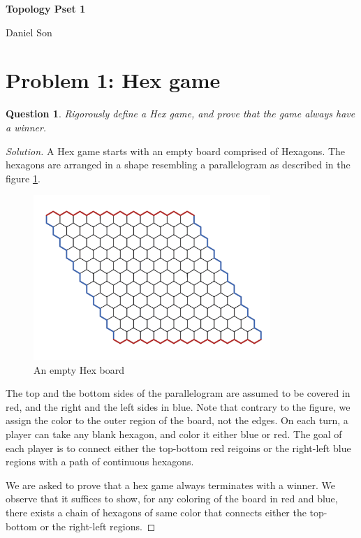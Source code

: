 \documentclass{article}
\newtheorem{question}{Question}
\begin{document}
\begin{center}
    \Large
    \textbf{Topology Pset 1}

    \large
    Daniel Son
\end{center}

\section{Problem 1: Hex game}
\begin{question}
Rigorously define a Hex game, and prove that the game always have a winner. 
\end{question}

\begin{proof}[Solution]
    A Hex game starts with an empty board comprised of Hexagons. The hexagons are arranged in a shape resembling a parallelogram as described in the figure \ref{fig:HexBoard}. 
    \begin{figure}[h]
        \centering
        \includegraphics[width=0.8\textwidth]{HexBoard.png} %
        \caption{An empty Hex board}
        \label{fig:HexBoard}
    \end{figure}
    
    The top and the bottom sides of the parallelogram are assumed to be covered in red, and the right and the left sides in blue. Note that contrary to the figure, we assign the color to the outer region of the board, not the edges. On each turn, a player can take any blank hexagon, and color it either blue or red. The goal of each player is to connect either the top-bottom red reigoins or the right-left blue regions with a path of continuous hexagons. 

    We are asked to prove that a hex game always terminates with a winner. We observe that it suffices to show, for any coloring of the board in red and blue, there exists a chain of hexagons of same color that connects either the top-bottom or the right-left regions. 


\end{proof}
\end{document}
